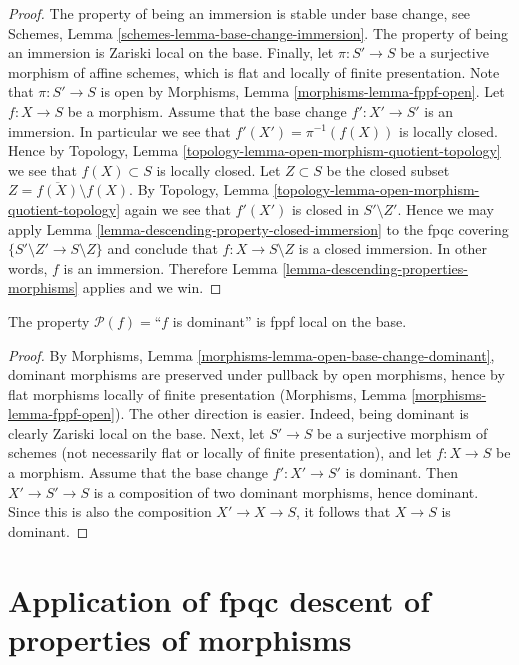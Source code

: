\begin{proof}
The property of being an immersion is stable under base change,
see Schemes, Lemma \ref{schemes-lemma-base-change-immersion}.
The property of being an immersion is Zariski local on the base.
Finally, let
$\pi : S' \to S$ be a surjective morphism of affine schemes,
which is flat and locally of finite presentation.
Note that $\pi : S' \to S$ is open by
Morphisms, Lemma \ref{morphisms-lemma-fppf-open}.
Let $f : X \to S$ be a morphism.
Assume that the base change $f' : X' \to S'$ is an immersion.
In particular we see that $f'(X') = \pi^{-1}(f(X))$ is locally closed.
Hence by Topology, Lemma \ref{topology-lemma-open-morphism-quotient-topology}
we see that $f(X) \subset S$
is locally closed. Let $Z \subset S$ be
the closed subset $Z = \overline{f(X)} \setminus f(X)$.
By Topology, Lemma \ref{topology-lemma-open-morphism-quotient-topology}
again we see that $f'(X')$ is closed in $S' \setminus Z'$.
Hence we may apply Lemma \ref{lemma-descending-property-closed-immersion}
to the fpqc covering $\{S' \setminus Z' \to S \setminus Z\}$
and conclude that $f : X \to S \setminus Z$ is a closed
immersion. In other words, $f$ is an immersion.
Therefore Lemma \ref{lemma-descending-properties-morphisms} applies and we win.
\end{proof}

\begin{lemma}
\label{lemma-descending-fppf-property-dominant}
The property $\mathcal{P}(f) =$``$f$ is dominant''
is fppf local on the base.
\end{lemma}

\begin{proof}
By Morphisms, Lemma \ref{morphisms-lemma-open-base-change-dominant},
dominant morphisms are preserved
under pullback by open morphisms, hence
by flat morphisms locally of finite presentation
(Morphisms, Lemma \ref{morphisms-lemma-fppf-open}).
The other direction is easier.
Indeed, being dominant is clearly Zariski local on the base.
Next, let $S' \to S$ be a surjective morphism of schemes
(not necessarily flat or locally of finite
presentation),
and let $f : X \to S$ be a morphism. Assume that the base change
$f' : X' \to S'$ is dominant. Then $X' \to S'\to S$ is a composition
of two dominant morphisms, hence dominant. Since this is also
the composition $X' \to X \to S$, it follows that $X\to S$ is dominant.
\end{proof}






\section{Application of fpqc descent of properties of morphisms}
\label{section-application-descending-properties-morphisms}


